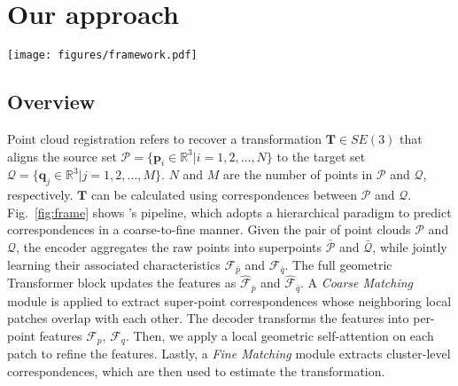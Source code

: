 \section{Our approach}

\begin{figure*}[t]
\centering  
\texttt{[image: figures/framework.pdf]}
\vspace{-3mm}
\caption{
The encoder downsizes the input point clouds and generates super-points with associated features. 
The global geometric Transformer injects geometric information into learned features. 
Coarse matching of the super-points is carried out between the two downsampled inputs. 
The local geometric Transformer is utilized to generate distinctive local features, which enables the prediction of fine-level correspondences between the inputs. 
Finally, the rigid transformation is estimated from the fine-level correspondences.}
\label{fig:frame}
\end{figure*}




\subsection{Overview}\label{sec:probf}
Point cloud registration refers to recover a transformation $\bm{T}\in SE(3)$ that aligns the source set $\bm{\mathcal{P}}=\{\bm{p}_i \in\mathbb{R}^{3}|i = 1, 2, ..., N\}$ to the target set $\bm{\mathcal{Q}}=\{\bm{q}_j \in\mathbb{R}^{3}|j = 1, 2, ..., M\}$.
$N$ and $M$ are the number of points in $\bm{\mathcal{P}}$ and $\bm{\mathcal{Q}}$, respectively. $\bm{T}$ can be calculated using correspondences between $\bm{\mathcal{P}}$ and $\bm{\mathcal{Q}}$. 
Fig.~\ref{fig:frame} shows \ourmethod's pipeline, which adopts a hierarchical paradigm to predict correspondences in a coarse-to-fine manner. 
Given the pair of point clouds $\bm{\mathcal{P}}$ and $\bm{\mathcal{Q}}$, the encoder aggregates the raw points into superpoints $\bar{\bm{\mathcal{P}}}$ and $\bar{\bm{\mathcal{Q}}}$, while jointly learning their associated characteristics $\bm{\mathcal{F}}_{\bar{p}}$ and $\bm{\mathcal{F}}_{\bar{q}}$. 
The full geometric Transformer block updates the features as $\hat{\bm{\mathcal{F}}}_{\bar{p}}$ and $\hat{\bm{\mathcal{F}}}_{\bar{q}}$. 
A \textit{Coarse Matching} module is applied to extract super-point correspondences whose neighboring local patches overlap with each other. 
The decoder transforms the features into per-point features $\bm{\mathcal{F}}_{p}$, $\bm{\mathcal{F}}_{q}$.
Then, we apply a local geometric self-attention on each patch to refine the features.
Lastly, a \textit{Fine Matching} module extracts cluster-level correspondences, which are then used to estimate the transformation.   

